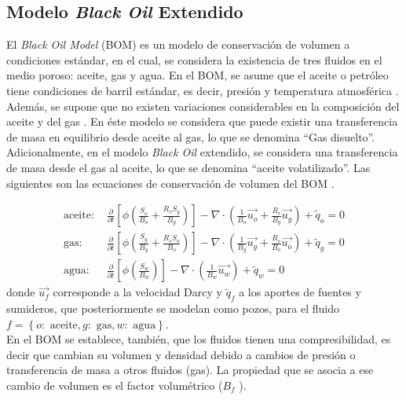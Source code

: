 \subsection{Modelo \emph{Black Oil} Extendido}

El \textit{Black Oil Model} (BOM) es un modelo de conservación de volumen a condiciones estándar, en el cual, se considera la existencia de tres fluidos en el medio poroso: aceite, gas y agua. En el BOM, se asume que el aceite o petróleo tiene condiciones de barril estándar, es decir, presión y temperatura atmosférica \citep{chen2007reservoir}. Además, se supone que no existen variaciones considerables en la composición del aceite y del gas \citep{jamal2006petroleum, chen2007reservoir, ertekin2001basic}. En éste modelo se considera que puede existir una transferencia de masa en equilibrio desde aceite al gas, lo que se denomina ``Gas disuelto''. Adicionalmente, en el modelo \textit{Black Oil} extendido, se considera una transferencia de masa desde el gas al aceite, lo que se denomina ``aceite volatilizado''. Las siguientes son las ecuaciones de conservación de volumen del BOM \citep{jamal2006petroleum, chen2007reservoir, ertekin2001basic}.

\begin{align}
\label{ec:aceite}
\text{aceite: }&\frac{\partial}{\partial t} \left[ \phi \left( \frac{S_{o}}{B_{o}} + \frac{R_{v} S_{g}}{B_{g}} \right) \right]
- \nabla \cdot \left( \frac{1}{B_{o}} \vec{u_{o}} + \frac{R_{v}}{B_{g}} \vec{u_{g}} \right) + \tilde{q}_{o}=0  \\
\label{ec:gas}
\text{gas: }&\frac{\partial}{\partial t} \left[ \phi \left( \frac{S_{g}}{B_{g}} + \frac{R_{s} S_{o}}{B_{o}} \right) \right]
- \nabla \cdot \left( \frac{1}{B_{g}} \vec{u_{g}} + \frac{R_{s}}{B_{o}} \vec{u_{o}} \right) + \tilde{q}_{g} = 0 \\
\label{ec:agua}
\text{agua: }&\frac{\partial}{\partial t} \left[\phi \left( \frac{S_{w}}{B_{w}} \right) \right] - \nabla \cdot \left( \frac{1}{B_{w}} \vec{u_{w}} \right) + \tilde{q}_{w} = 0 
\end{align}
donde $\vec{u_{f}}$ corresponde a la velocidad Darcy y $\tilde{q}_{f}$ a los aportes de fuentes y sumideros, que posteriormente se modelan como pozos, para el fluido $f = \left\lbrace o:\text{ aceite}, g:\text{ gas}, w:\text{ agua} \right\rbrace $.\\

En el BOM se establece, también, que los fluidos tienen una compresibilidad, es decir que cambian su volumen y densidad debido a cambios de presión o transferencia de masa a otros fluidos (gas). La propiedad que se asocia a ese cambio de volumen es el factor volumétrico ($B_{f}$ \citep{chen2007reservoir}).\\

